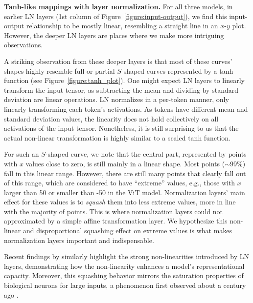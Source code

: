 \documentclass[]{fairmeta}
\renewcommand{\paragraph}[1]{\vspace{1.25mm}\noindent\textbf{#1}}
\begin{document}
\paragraph{Tanh-like mappings with layer normalization.} For all three models, in earlier LN layers (1st column of Figure~\ref{figure:input-output}), we find this input-output relationship to be mostly linear, resembling a straight line in an $x$-$y$ plot. However, the deeper LN layers are places where we make more intriguing observations.

A striking observation from these deeper layers is that most of these curves' shapes highly resemble full or partial $S$-shaped curves represented by a tanh function (see Figure~\ref{figure:tanh_plot}). One might expect LN layers to linearly transform the input tensor, as subtracting the mean and dividing by standard deviation are linear operations. LN normalizes in a per-token manner, only linearly transforming each token's activations. As tokens have different mean and standard deviation values, the linearity does not hold collectively on all activations of the input tensor.
Nonetheless, it is still surprising to us that the actual non-linear transformation is highly similar to a scaled tanh function.


\vskip 0.2cm
For such an $S$-shaped curve, we note that the central part, represented by points with $x$ values close to zero, is still mainly in a linear shape. Most points ($\sim$99\%) fall in this linear range. 
However, there are still many points that clearly fall out of this range, which are considered to have ``extreme'' values, e.g., those with $x$ larger than 50 or smaller than -50 in the ViT model. Normalization layers' main effect for these values is to \emph{squash} them into less extreme values, more in line with the majority of points. This is where normalization layers could not approximated by a simple affine transformation layer. We hypothesize this non-linear and disproportional squashing effect on extreme values is what makes normalization layers important and indispensable. 

\vskip 0.2cm
Recent findings by \citet{ni2024nonlinearity} similarly highlight the strong non-linearities introduced by LN layers, demonstrating how the non-linearity enhances a model’s representational capacity. Moreover, this squashing behavior mirrors the saturation properties of biological neurons for large inputs, a phenomenon first observed about a century ago \citep{adrian1926impulses, adrian1926impulses2, adrian1926impulses3}.
\end{document}
